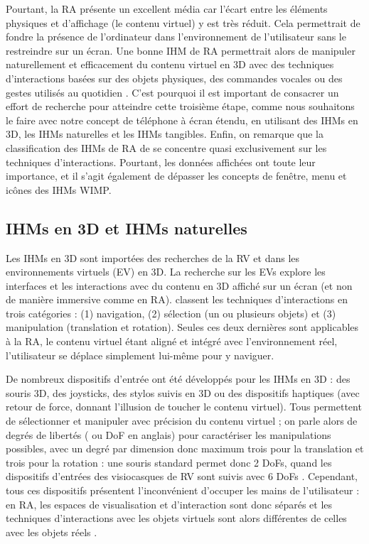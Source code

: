 Pourtant, la RA présente un excellent média car l'écart entre les éléments physiques et d'affichage (le contenu virtuel) y est très réduit. Cela permettrait de fondre la présence de l'ordinateur dans l'environnement de l'utilisateur sans le restreindre sur un écran. Une bonne IHM de RA permettrait alors de manipuler naturellement et efficacement du contenu virtuel en 3D avec des techniques d'interactions basées sur des objets physiques, des commandes vocales ou des gestes utilisés au quotidien \citep{Billinghurst2005}. C'est pourquoi il est important de consacrer un effort de recherche pour atteindre cette troisième étape, comme nous souhaitons le faire avec notre concept de téléphone à écran étendu, en utilisant des IHMs en 3D, les IHMs naturelles et les IHMs tangibles. Enfin, on remarque que la classification des IHMs de RA de \cite{Billinghurst2015} se concentre quasi exclusivement sur les techniques d'interactions. Pourtant, les données affichées ont toute leur importance, et il s'agit également de dépasser les concepts de fenêtre, menu et icônes des IHMs WIMP.

\subsection{IHMs en 3D et IHMs naturelles}
\label{subsec:litterature_ar_hci_interactions}

Les IHMs en 3D sont importées des recherches de la RV et dans les environnements virtuels (EV) en 3D. La recherche sur les EVs explore les interfaces et les interactions avec du contenu en 3D affiché sur un écran (et non de manière immersive comme en RA). \cite{Bowman2004} classent les techniques d'interactions en trois catégories : (1) navigation, (2) sélection (un ou plusieurs objets) et (3) manipulation (translation et rotation). Seules ces deux dernières sont applicables à la RA, le contenu virtuel étant aligné et intégré avec l'environnement réel, l'utilisateur se déplace simplement lui-même pour y naviguer.

De nombreux dispositifs d'entrée ont été développés pour les IHMs en 3D : des souris 3D, des joysticks, des stylos suivis en 3D ou des dispositifs haptiques (avec retour de force, donnant l'illusion de toucher le contenu virtuel). Tous permettent de sélectionner et manipuler avec précision du contenu virtuel ; on parle alors de degrés de libertés ( ou DoF en anglais) pour caractériser les manipulations possibles, avec un degré par dimension donc maximum trois pour la translation et trois pour la rotation : une souris standard permet donc 2 DoFs, quand les dispositifs d'entrées des visiocasques de RV sont suivis avec 6 DoFs . Cependant, tous ces dispositifs présentent l'inconvénient d'occuper les mains de l'utilisateur : en RA, les espaces de visualisation et d'interaction sont donc séparés  et les techniques d'interactions avec les objets virtuels sont alors différentes de celles avec les objets réels \cite{Billinghurst2015}.

